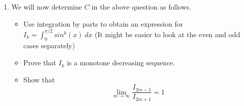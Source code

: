 \documentclass{article}
\begin{document}
\begin{enumerate}
        let's consider the Stirling's approximation for $\Gamma(n)$ for positive integer
        $n\gg1$

        \begin{equation}
            \Gamma(n+1) = n!
        \end{equation}

        \begin{equation}
            \ln(\Gamma(n+1)) = \ln n! = \ln (1 \cdot 2 \cdot 3 \cdot ... \cdot (n-1) \cdot n) = \displaystyle \sum_{k=1}^{n} \ln k
        \end{equation}

The first two terms in Eq.(6) give us the following approximation:

\begin{equation*}
    \ln(\Gamma(n+1)) &= \ln(n!) = \displaystyle \int_{1}^{n} \ln(x)\ dx + \frac{1}{2} (\ln(1) + \ln(n)) \\
    &= x \ln(x)\bigg|_{1}^{n} - \displaystyle \int_{1}^{n} \frac{x}{x}\ dx + \frac{1}{2} \ln(n) \\
    &= n \ln(n) - n + 1 + \frac{1}{2} \ln(n)
\end{equation*}

Let's notice first that the term with the derivatives of $\ln(x)$ at $x=n$ in Eq.(6) are
proportional to negative powers of $n$ and thus $\rightarrow 0$ as $n \rightarrow \infty$.
On the other hand, the sum of the term with the derivatives of $\ln(x)$ at $x=1$ is a
constant independent of $n$. Thus, 

\begin{align*}
    \ln \Gamma(n+1) &= \ln n!  \\
                    &= \ln \left(\frac{n}{e}\right)^{n} + \ln \sqrt{n} + \ln(C) \\
                    &= \ln \left(C \sqrt{n} \left(\frac{n}{e}\right)^{n}\right)
\end{align*}

\item We will now determine $C$ in the above question as follows.
\begin{itemize}
    \item Use integration by parts to obtain an expression for $I_{k} = \displaystyle
        \int_{0}^{\pi/2} sin^{k}(x)\ dx$ (It might be easier to look at the even and odd
        cases separately)

    \item Prove that $I_{k}$ is a monotone decreasing sequence.

    \item Show that
        \begin{equation*}
            \lim_{m \to \infty} \frac{I_{2m - 1}}{I_{2m + 1}} = 1
        \end{equation*}


\end{itemize}
\end{enumerate}
\end{document}
